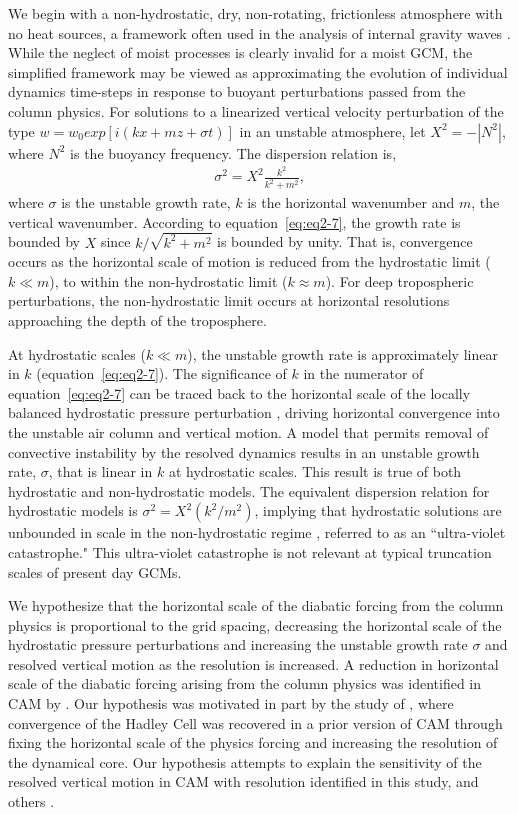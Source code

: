 We begin with a non-hydrostatic, dry, non-rotating, frictionless atmosphere with no heat sources, a framework often used in the analysis of internal gravity waves \citep{H2004}. While the neglect of moist processes is clearly invalid for a moist GCM, the simplified framework may be viewed as approximating the evolution of individual dynamics time-steps in response to buoyant perturbations passed from the column physics. For solutions to a linearized vertical velocity perturbation of the type $w = w_0 exp[i(kx + mz + \sigma t)]$ in an unstable atmosphere, let $X^2 = -| N^2 |$, where $N^2$ is the buoyancy frequency. The dispersion relation is, 
\begin{eqnarray}
\sigma^2 = X^2 \frac{k^2}{k^2 + m^2},\label{eq:eq2-7}
\end{eqnarray}
where $\sigma$ is the unstable growth rate, $k$ is the horizontal wavenumber and $m$, the vertical wavenumber. According to equation~\ref{eq:eq2-7}, the growth rate is bounded by $X$ since $k/\sqrt{k^2 + m^2}$ is bounded by unity. That is, convergence occurs as the horizontal scale of motion is reduced from the hydrostatic limit ($k \ll m$), to within the non-hydrostatic limit ($k \approx m$). For deep tropospheric perturbations, the non-hydrostatic limit occurs at horizontal resolutions approaching the depth of the troposphere.

At hydrostatic scales ($k \ll m$), the unstable growth rate is approximately linear in $k$ (equation~\ref{eq:eq2-7}). The significance of $k$ in the numerator of equation~\ref{eq:eq2-7} can be traced back to the horizontal scale of the locally balanced hydrostatic pressure perturbation \citep{JR2016QJRMS}, driving horizontal convergence into the unstable air column and vertical motion. A model that permits removal of convective instability by the resolved dynamics results in an unstable growth rate, $\sigma$, that is linear in $k$ at hydrostatic scales. This result is true of both hydrostatic and non-hydrostatic models. The equivalent dispersion relation for hydrostatic models is $\sigma^2 = X^2 (k^2 / m^2)$, implying that hydrostatic solutions are unbounded in scale in the non-hydrostatic regime \citep{O1981JAS}, referred to as an ``ultra-violet catastrophe." This ultra-violet catastrophe is not relevant at typical truncation scales of present day GCMs. 

We hypothesize that the horizontal scale of the diabatic forcing from the column physics is proportional to the grid spacing, decreasing the horizontal scale of the hydrostatic pressure perturbations and increasing the unstable growth rate $\sigma$ and resolved vertical motion as the resolution is increased. A reduction in horizontal scale of the diabatic forcing arising from the column physics was identified in CAM by \cite{HETAL2006JCLIM}. Our hypothesis was motivated in part by the study of \cite{W1999T}, where convergence of the Hadley Cell was recovered in a prior version of CAM through fixing the horizontal scale of the physics forcing and increasing the resolution of the dynamical core. Our hypothesis attempts to explain the sensitivity of the resolved vertical motion in CAM with resolution identified in this study, and others \citep{KW1991JGR,LETAL2011TELLUS,YETAL2014JCLIM,OETAL2016JAMES}.

